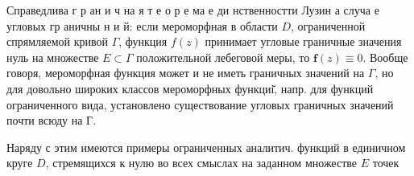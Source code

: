\documentclass[10pt]{article}
\begin{document}
Справедлива г р ан и ч на я т е о р е ма е ди нственностти Лузин а случа е угловых гр аничны н и й: если мероморфная в области $D$, ограниченной спрямляемой кривой $\Gamma$, функция $f(z)$ принимает угловые граничные значения нуль на множестве $E \subset \Gamma$ положительной лебеговой меры, то $\boldsymbol{f}(z) \equiv 0$. Вообще говоря, мероморфная функция может и не иметь граничных значений на $\Gamma$, но для довольно широких классов мероморфных функциі̆, напр. для функций ограниченного вида, установлено существование угловых граничных значений почти всюду на $Г$.



Наряду с этим имеются примеры ограниченных аналитич. функций в единичном круге $D$, стремящихся к нулю во всех смыслах на заданном множестве $E$ точек
\end{document}
